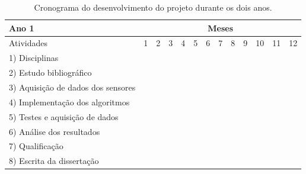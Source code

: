 \documentclass[acronym, symbols, table]{fei}
\begin{document}
		\begin{table}[!htb]
			\centering
			\caption{Cronograma do desenvolvimento do projeto durante os dois anos.}\label{tab:cronograma}
			\begin{tabular}{>{\raggedright}p{}|c|c|c|c|c|c|c|c|c|c|c|c|}
				\cline{2-13}
				Ano 1 & \multicolumn{12}{c|}{Meses} \\ \hline
				Atividades                       				 &  1 &  2 &  3 &  4 &  5 &  6 &  7 &  8 &  9 & 10 & 11 & 12 \\ \hline \hline
				\small 1) Disciplinas   						 & \X & \X & \X & \X & \X & \X & \X & \X & \X & \X & \X & \X \\ \hline
				\small 2) Estudo bibliográfico   				 & \X & \X & \X & \X & \X & \X & \X & \X & \X & \X & \X & \X \\ \hline
				\small 3) Aquisição de dados dos sensores        &    &    &    &    &    &    &    &    &    &    &    &    \\ \hline
				\small 4) Implementação dos algoritmos  	 	 &    &    &    &    &    &    &    &    &    &    &    &    \\ \hline
				\small 5) Testes e aquisição de dados   		 &    &    &    &    &    &    &    &    &    &    &    &    \\ \hline
				\small 6) Análise dos resultados   			 	 &    &    &    &    &    &    &    &    &    &    &    &    \\ \hline
				\small 7) Qualificação   			 	 		 &    &    &    &    &    &    &    &    &    &    &    &    \\ \hline
				\small 8) Escrita da dissertação   				 &    &    &    &    &    &    &    &    &    & \X & \X & \X \\ \hline				
			\end{tabular}
			
			\hfill\break
			

\end{table}
\end{document}
